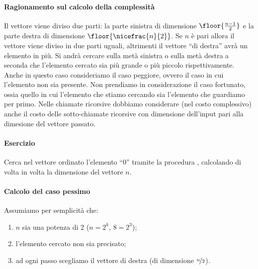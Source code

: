 \paragraph{Ragionamento sul calcolo della complessità}
Il vettore viene diviso due parti: la parte sinistra di dimensione \(\floor{\frac{n-1}{2}}\) e la parte destra di dimensione \(\floor{\nicefrac{n}{2}}\).
Se \(n\) è pari allora il vettore viene diviso in due parti uguali, altrimenti il vettore \enquote{di destra} avrà un elemento in più.
Si andrà cercare sulla metà sinistra o sulla metà destra a seconda che l'elemento cercato sia più grande o più piccolo rispettivamente.
Anche in questo caso consideriamo il caso peggiore, ovvero il caso in cui l'elemento non sia presente.
Non prendiamo in considerazione il caso fortunato, ossia quello in cui l'elemento che stiamo cercando sia l'elemento che guardiamo per primo.
Nelle chiamate ricorsive dobbiamo considerare (nel costo complessivo) anche il costo delle sotto-chiamate ricorsive con dimensione dell'input pari alla dimesione del vettore passato.

\paragraph{Esercizio}
Cerca nel vettore ordinato l'elemento \enquote{\(0\)} tramite la procedura \binarySearch, calcolando di volta in volta la dimensione del vettore \(n\).

\begin{figure}[H]
	\centering
\end{figure}

\paragraph{Calcolo del caso pessimo}
Assumiamo per semplicità che:
\begin{enumerate}
	\item \(n\) sia una potenza di 2 (\(n = 2^k\), \(8 = 2^3\));
	\item l'elemento cercato non sia precisato;
	\item ad ogni passo scegliamo il vettore di destra (di dimensione \(\nicefrac{n}{2}\)).
\end{enumerate}

